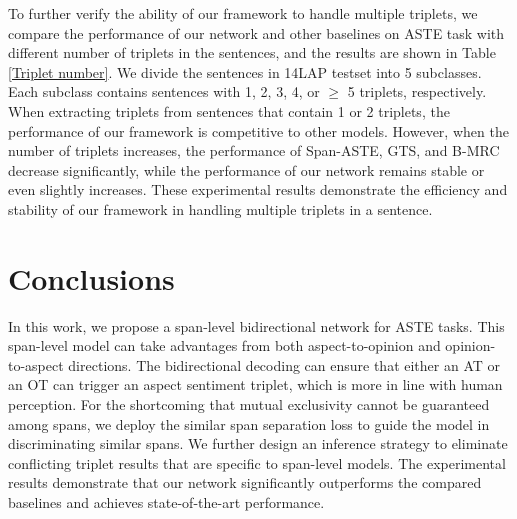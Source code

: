 \documentclass[11pt]{article}
\begin{document}
\begin{table}[htpb]
	\footnotesize
	\centering
	\caption{Effects of multiple triplets in a sentence in 14LAP (\emph{F1-score}, \%).}
	\label{Triplet number}
\end{table}

To further verify the ability of our framework to handle multiple triplets, we compare the performance of our network and other baselines on ASTE task with different number of triplets in the sentences, and the results are shown in Table \ref{Triplet number}. We divide the sentences in 14LAP testset into 5 subclasses. Each subclass contains sentences with 1, 2, 3, 4, or $\geq$ 5 triplets, respectively. When extracting triplets from sentences that contain 1 or 2 triplets, the performance of our framework is competitive to other models. However, when the number of triplets increases, the performance of Span-ASTE, GTS, and B-MRC decrease significantly, while the performance of our network remains stable or even slightly increases. These experimental results demonstrate the efficiency and stability of our framework in handling multiple triplets in a sentence.

\section{Conclusions}
In this work, we propose a span-level bidirectional network for ASTE tasks. This span-level model can take advantages from both aspect-to-opinion and opinion-to-aspect directions. The bidirectional decoding can ensure that either an AT or an OT can trigger an aspect sentiment triplet, which is more in line with human perception. For the shortcoming that mutual exclusivity cannot be guaranteed among spans, we deploy the similar span separation loss to guide the model in discriminating similar spans. We further design an inference strategy to eliminate conflicting triplet results that are specific to span-level models. The experimental results demonstrate that our network significantly outperforms the compared baselines and achieves state-of-the-art performance. 
\end{document}
